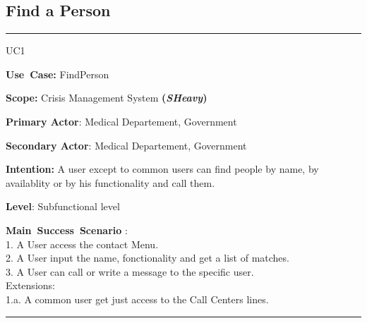 \subsection{Find a Person}
\vspace{0.5cm}
\hrule
\vspace{0.5cm}
\begin{lyxlist}{UC1}
\small{
\item [\textbf{Use~Case:}] FindPerson
\item [\textbf{Scope:}] Crisis Management System \textbf{(\emph{SHeavy})}
\item [\textbf{Primary Actor}:] Medical Departement, Government
\item [\textbf{Secondary Actor}:] Medical Departement, Government
\item [\textbf{Intention:}]A user except to common users can find people by name, by availablity or by
his functionality and call them.
\item [\textbf{Level}:]Subfunctional level
\item [\textbf{Main~Success~Scenario}]:\\
1. A User access the contact Menu.\\
2. A User input the name, fonctionality and get a list of matches.\\
3. A User can call or write a message to the specific user.\\
Extensions:\\ 
	1.a. A common user get just access to the Call Centers lines.\\
}
\end{lyxlist}
\hrule 
\vspace{0.5cm} 

